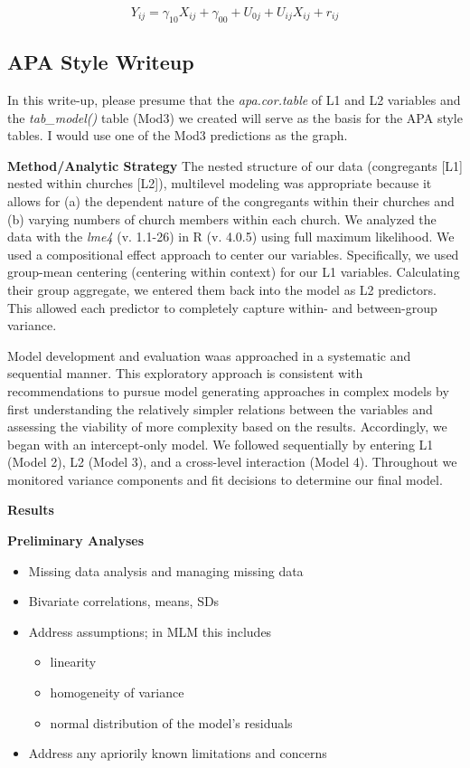 \documentclass[
  11pt,
]{book}
\providecommand{\tightlist}{%
  \setlength{\itemsep}{0pt}\setlength{\parskip}{0pt}}
\begin{document}
\[Y_{ij}=\gamma _{10}X_{ij}+\gamma _{00}+U_{0j}+U_{ij}X_{ij}+r_{ij}\]

\hypertarget{apa-style-writeup}{%
\subsection{APA Style Writeup}\label{apa-style-writeup}}

In this write-up, please presume that the \emph{apa.cor.table} of L1 and L2 variables and the \emph{tab\_model()} table (Mod3) we created will serve as the basis for the APA style tables. I would use one of the Mod3 predictions as the graph.

\textbf{Method/Analytic Strategy}
The nested structure of our data (congregants {[}L1{]} nested within churches {[}L2{]}), multilevel modeling was appropriate because it allows for (a) the dependent nature of the congregants within their churches and (b) varying numbers of church members within each church. We analyzed the data with the \emph{lme4} (v. 1.1-26) in R (v. 4.0.5) using full maximum likelihood. We used a compositional effect \citep{enders_centering_2007} approach to center our variables. Specifically, we used group-mean centering (centering within context) for our L1 variables. Calculating their group aggregate, we entered them back into the model as L2 predictors. This allowed each predictor to completely capture within- and between-group variance.

Model development and evaluation waas approached in a systematic and sequential manner. This exploratory approach is consistent with recommendations to pursue model generating approaches in complex models \citep{bollen_testing_1993} by first understanding the relatively simpler relations between the variables \citep[e.g.,][]{hancock_hierarchical_2010, petscher_linear_2013} and assessing the viability of more complexity based on the results. Accordingly, we began with an intercept-only model. We followed sequentially by entering L1 (Model 2), L2 (Model 3), and a cross-level interaction (Model 4). Throughout we monitored variance components and fit decisions to determine our final model.

\textbf{Results}

\textbf{Preliminary Analyses}

\begin{itemize}
\tightlist
\item
  Missing data analysis and managing missing data
\item
  Bivariate correlations, means, SDs
\item
  Address assumptions; in MLM this includes

  \begin{itemize}
  \tightlist
  \item
    linearity
  \item
    homogeneity of variance
  \item
    normal distribution of the model's residuals
  \end{itemize}
\item
  Address any apriorily known limitations and concerns
\end{itemize}
\end{document}
